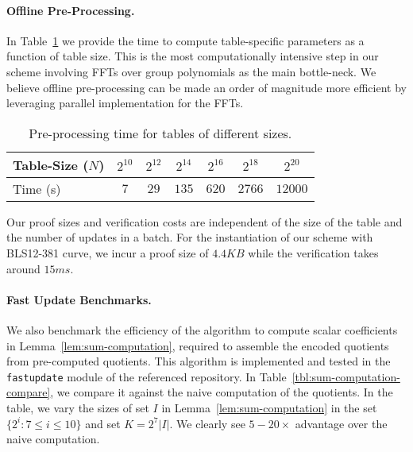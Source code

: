 \paragraph{\bf Offline Pre-Processing.} In Table~\ref{tbl:offline-proving-time} we provide the time to compute
table-specific parameters as a function of table size. This is the most computationally intensive step in our
scheme involving FFTs over group polynomials as the main bottle-neck. We believe offline pre-processing can be
made an order of magnitude more efficient by leveraging parallel implementation for the FFTs.

\begin{table}[htbp]
	\centering
    \begin{tabular}{|l|c|c|c|c|c|c|}
        \hline
        \cellcolor{lightgray} Table-Size ($N$) & $2^{10}$ & $2^{12}$ & $2^{14}$ & $2^{16}$ & $2^{18}$ & $2^{20}$ \\ \hline
        \cellcolor{lightgray} Time (s) & $7$ & $29$ & $135$ & $620$ & $2766$ & $12000$ \\ \hline
    \end{tabular}
    \caption{Pre-processing time for tables of different sizes.}
    \label{tbl:offline-proving-time}
\end{table}


 Our proof sizes and verification costs are independent of the
size of the table and the number of updates in a batch. For the instantiation of our scheme with BLS12-381 curve,
we incur a proof size of $4.4KB$ while the verification takes around $15ms$.

\paragraph{\bf Fast Update Benchmarks.} We also benchmark the efficiency of the algorithm to compute
 scalar coefficients in Lemma~\ref{lem:sum-computation}, required to assemble the encoded quotients from pre-computed quotients.
This algorithm is implemented and tested in the {\tt fastupdate} module of the referenced repository.
In Table~\ref{tbl:sum-computation-compare}, we compare it against the naive computation of the quotients.
In the table, we vary the sizes of set $I$ in Lemma~\ref{lem:sum-computation} in the set $\{2^i:7\leq i\leq 10\}$
and set $K=2^7|I|$. %
We clearly see $5-20\times$ advantage over the naive computation.


